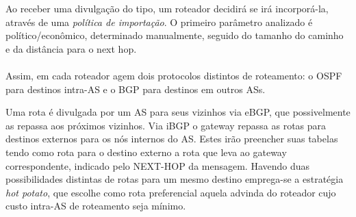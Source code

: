 Ao receber uma divulgação do tipo, um roteador decidirá se irá incorporá-la, através de uma \emph{política de importação}.
O primeiro parâmetro analizado é político/econômico, determinado manualmente, seguido do tamanho do caminho e da distância para o next hop.

\paragraph{}
Assim, em cada roteador agem dois protocolos distintos de roteamento: o OSPF para destinos intra-AS e o BGP para destinos em outros ASs.

Uma rota é divulgada por um AS para seus vizinhos via eBGP, que possivelmente as repassa aos próximos vizinhos.
Via iBGP o gateway repassa as rotas para destinos externos para os nós internos do AS. 
Estes irão preencher suas tabelas tendo como rota para o destino externo a rota que leva ao gateway correspondente, indicado pelo NEXT-HOP da mensagem.
Havendo duas possibilidades distintas de rotas para um mesmo destino emprega-se a estratégia \emph{hot potato}, 
que escolhe como rota preferencial aquela advinda do roteador cujo custo intra-AS de roteamento seja mínimo.

